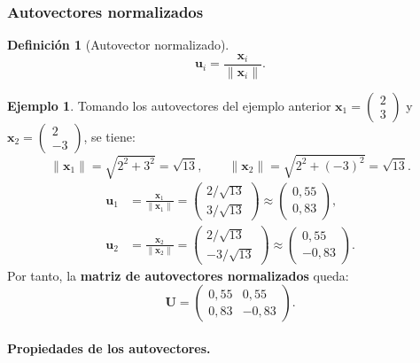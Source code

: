 \documentclass[12pt, a4paper]{article}
\theoremstyle{plain}
\theoremstyle{definition}
\newtheorem{definicion}[teorema]{Definición}
\newtheorem{ejemplo}{Ejemplo}[section]
\theoremstyle{remark}
\newcommand{\mat}[1]{\mathbf{#1}}
\begin{document}
\subsubsection{Autovectores normalizados}

\begin{definicion}[Autovector normalizado]
\[
  \mathbf{u}_i = \frac{\mathbf{x}_i}{\|\mathbf{x}_i\|}.
\]
\end{definicion}

\begin{ejemplo}
Tomando los autovectores del ejemplo anterior
$\mathbf{x}_1=\begin{pmatrix}2\\3\end{pmatrix}$ y
$\mathbf{x}_2=\begin{pmatrix}2\\-3\end{pmatrix}$, se tiene:
\[
  \|\mathbf{x}_1\|=\sqrt{2^2+3^2}=\sqrt{13},\qquad
  \|\mathbf{x}_2\|=\sqrt{2^2+(-3)^2}=\sqrt{13}.
\]
\begin{align}
  \mathbf{u}_1
  &= \frac{\mathbf{x}_1}{\|\mathbf{x}_1\|}
   = \begin{pmatrix}2/\sqrt{13}\\3/\sqrt{13}\end{pmatrix}
   \approx \begin{pmatrix}0{,}55\\0{,}83\end{pmatrix}, \\
  \mathbf{u}_2
  &= \frac{\mathbf{x}_2}{\|\mathbf{x}_2\|}
   = \begin{pmatrix}2/\sqrt{13}\\-3/\sqrt{13}\end{pmatrix}
   \approx \begin{pmatrix}0{,}55\\-0{,}83\end{pmatrix}.
\end{align}
Por tanto, la \textbf{matriz de autovectores normalizados} queda:
\[
  \mat{U}=\begin{pmatrix}0{,}55&0{,}55\\0{,}83&-0{,}83\end{pmatrix}.
\]
\end{ejemplo}

\paragraph{Propiedades de los autovectores.}
\end{document}
